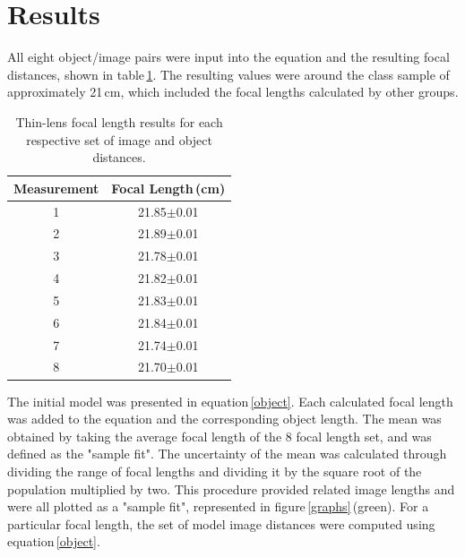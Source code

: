 \documentclass[twocolumn]{aastex6}
\begin{document}
\section{Results}

All eight object/image pairs were input into the equation and the resulting focal distances, shown in table\,\ref{focaltable}. The resulting values were around the class sample of approximately 21\,cm, which included the focal lengths calculated by other groups.




\begin{table}[h]
\begin{center}
\caption{Thin-lens focal length results for each respective set of image and object distances.}

\begin{tabular}{ c | c }

Measurement & Focal Length\,(cm) \\ \hline \hline
1 & 21.85$\pm$0.01 \\
2 & 21.89$\pm$0.01  \\ 
3 & 21.78$\pm$0.01  \\  
4 & 21.82$\pm$0.01  \\ 
5 & 21.83$\pm$0.01  \\ 
6 & 21.84$\pm$0.01  \\ 
7 & 21.74$\pm$0.01  \\ 
8 & 21.70$\pm$0.01  \\ 

\end{tabular}
\label{focaltable}
\end{center}
\end{table}









The initial model was presented in equation\,\ref{object}. Each calculated focal length was added to the equation and the corresponding object length. The mean was obtained by taking the average focal length of the 8 focal length set, and was defined as the "sample fit". The uncertainty of the mean was calculated through dividing the range of focal lengths and dividing it by the square root of the population multiplied by two. This procedure provided related image lengths and were all plotted as a "sample fit", represented in figure\,\ref{graphs}\,(green). For a particular focal length, the set of model image distances were computed using equation\,\ref{object}.
\end{document}
